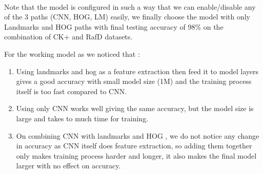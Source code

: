 \paragraph{}
Note that the model is configured in such a way that we can enable/disable any of the 3 paths (CNN, HOG, LM) easily, we finally choose the model with only Landmarks and HOG paths with final testing accuracy of 98\% on the combination of CK+ and RafD datasets.

For the working model as we noticed that :
\begin{enumerate}
	\item Using landmarks and hog as a feature extraction then feed it to model layers gives a good accuracy with small model size (1M) and the training process itself is too fast compared to CNN.
	\item Using only CNN works well giving the same accuracy, but the model size is large and takes to much time for training.
	\item On combining CNN with landmarks and HOG , we do not notice any change in accuracy as CNN itself does feature extraction, so adding them together only makes training process harder and longer, it also makes the final model larger with no effect on accuracy.
\end{enumerate} 